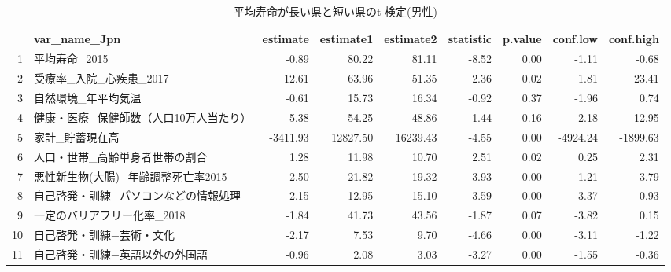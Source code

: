 \begin{table}[ht]
\centering
\caption{平均寿命が長い県と短い県のt-検定(男性)} 
\label{LE_Ttest_d_m.tex}
\begingroup\tiny
\begin{tabular}{rlrrrrrrr}
  \hline
 & var\_name\_Jpn & estimate & estimate1 & estimate2 & statistic & p.value & conf.low & conf.high \\ 
  \hline
1 & 平均寿命\_2015 & -0.89 & 80.22 & 81.11 & -8.52 & 0.00 & -1.11 & -0.68 \\ 
  2 & 受療率\_入院\_心疾患\_2017 & 12.61 & 63.96 & 51.35 & 2.36 & 0.02 & 1.81 & 23.41 \\ 
  3 & 自然環境\_年平均気温 & -0.61 & 15.73 & 16.34 & -0.92 & 0.37 & -1.96 & 0.74 \\ 
  4 & 健康・医療\_保健師数（人口10万人当たり） & 5.38 & 54.25 & 48.86 & 1.44 & 0.16 & -2.18 & 12.95 \\ 
  5 & 家計\_貯蓄現在高 & -3411.93 & 12827.50 & 16239.43 & -4.55 & 0.00 & -4924.24 & -1899.63 \\ 
  6 & 人口・世帯\_高齢単身者世帯の割合 & 1.28 & 11.98 & 10.70 & 2.51 & 0.02 & 0.25 & 2.31 \\ 
  7 & 悪性新生物(大腸)\_年齢調整死亡率2015 & 2.50 & 21.82 & 19.32 & 3.93 & 0.00 & 1.21 & 3.79 \\ 
  8 & 自己啓発・訓練−パソコンなどの情報処理 & -2.15 & 12.95 & 15.10 & -3.59 & 0.00 & -3.37 & -0.93 \\ 
  9 & 一定のバリアフリー化率\_2018 & -1.84 & 41.73 & 43.56 & -1.87 & 0.07 & -3.82 & 0.15 \\ 
  10 & 自己啓発・訓練−芸術・文化 & -2.17 & 7.53 & 9.70 & -4.66 & 0.00 & -3.11 & -1.22 \\ 
  11 & 自己啓発・訓練−英語以外の外国語 & -0.96 & 2.08 & 3.03 & -3.27 & 0.00 & -1.55 & -0.36 \\ 
   \hline
\end{tabular}
\endgroup
\end{table}
